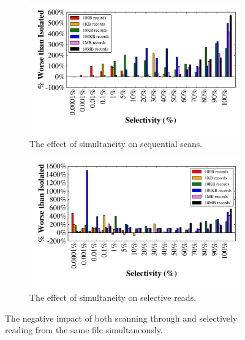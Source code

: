 \begin{figure}
  \centering
  \begin{subfigure}[b]{\textwidth}
    \centering
    \includegraphics[width=\textwidth]{fault_tolerance/graphs/simultaneous_scan_same_file}
    \caption{\label{fig:simultaneous_same_file_scan} The effect of
      simultaneity on sequential scans.}
  \end{subfigure}
  \begin{subfigure}[b]{\textwidth}
    \centering
    \includegraphics[width=\textwidth]{fault_tolerance/graphs/simultaneous_seek_same_file}
    \caption{\label{fig:simultaneous_same_file_seek} The effect of
      simultaneity on selective reads.}
  \end{subfigure}
  \caption{\label{fig:simultaneous_same_file} The negative impact of
    both scanning through and selectively reading from the same file simultaneously.}
\end{figure}

